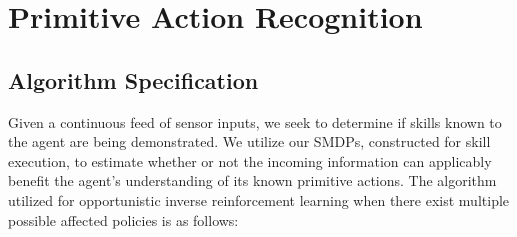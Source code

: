 \documentclass[letterpaper]{article}
\begin{document}
\section{Primitive Action Recognition}
\subsection{Algorithm Specification}
\label{sec:recognition}
Given a continuous feed of sensor inputs, we seek to determine if skills known to the agent are being demonstrated. We utilize our SMDPs, constructed for skill execution, to estimate whether or not the incoming information can applicably benefit the agent's understanding of its known primitive actions. The algorithm utilized for opportunistic inverse reinforcement learning when there exist multiple possible affected policies is as follows:
\end{document}
